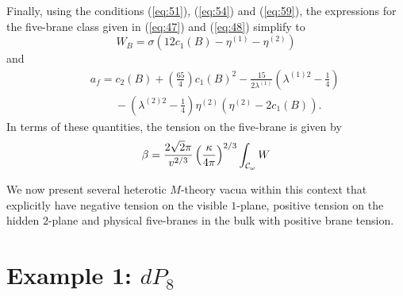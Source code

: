 \documentclass[a4paper,12pt]{article}
\numberwithin{equation}{section}
\theoremstyle{plain}
\begin{document}
Finally, using the conditions (\ref{eq:51}), (\ref{eq:54}) and (\ref{eq:59}),
the expressions for the five-brane class given in (\ref{eq:47}) and
(\ref{eq:48}) simplify to
%
\begin{equation}
W_{B}=\sigma(12c_{1}(B)-\eta^{(1)}-\eta^{(2)})
\label{eq:65}
\end{equation}
%
and
%
\begin{eqnarray}
\nonumber
& & a_{f}= c_{2}(B)+\left(\frac{65}{4}\right)c_{1}(B)^{2}
-\frac{15}{2\lambda^{(1)}}\left(\lambda^{(1)2}-\frac{1}{4}\right) \\
& & \;\;\;\;\;\;\;\;-\left(\lambda^{(2)2}-\frac{1}{4}\right)\eta^{(2)}(\eta^{(2)}-2c_{1}(B)).
\label{eq:66}
\end{eqnarray}
%
In terms of these quantities, the tension on the five-brane is given by
%
\begin{equation}
\beta=\frac{2\sqrt{2}\pi}{v^{2/3}}\left(\frac{\kappa}{4\pi}\right)^{2/3}
\int_{{\cal{C}}_{\omega}}{W}
\label{eq:67}
\end{equation}
%



We now present several heterotic $M$-theory vacua within this context that
explicitly have negative tension on the visible $1$-plane, positive tension on
the hidden $2$-plane and physical five-branes in the bulk with positive brane
tension.

\section*{Example 1: $dP_{8}$}
\end{document}
